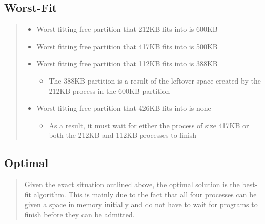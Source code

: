 \documentclass[letterpaper, 10pt,DIV=13]{scrartcl}
\numberwithin{equation}{section} %
\numberwithin{figure}{section} %
\numberwithin{table}{section} %
\begin{document}
\subsection{Worst-Fit}
\begin{quote}

    \begin{itemize}
      \item {Worst fitting free partition that 212KB fits into is 600KB}
      \item {Worst fitting free partition that 417KB fits into is 500KB}
      \item {Worst fitting free partition that 112KB fits into is 388KB}
        \begin{itemize}
            \item {The 388KB partition is a result of the leftover space created by the 212KB process in the 600KB partition}
        \end{itemize}
      \item {Worst fitting free partition that 426KB fits into is none}
      \begin{itemize}
        \item {As a result, it must wait for either the process of size 417KB or both the 212KB and 112KB processes to finish}
        \end{itemize}
    \end{itemize}    

\end{quote}

\subsection{Optimal}
\begin{quote}
   
    Given the exact situation outlined above, the optimal solution is the best-fit algorithm. This is mainly due to the fact that all four processes can be given a space in memory initially and do not have to wait for programs to finish before they can be admitted. 
    
\end{quote}
\end{document}
